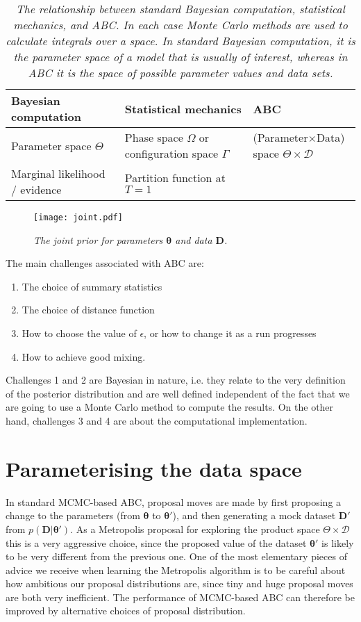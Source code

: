 \documentclass[a4paper, 11pt]{article}
\newcommand{\params}{\boldsymbol{\theta}}	%
\newcommand{\data}{\boldsymbol{D}}  %
\begin{document}
\begin{table}[ht!]
\centering
\small
\begin{tabular}{lll}
\hline
Bayesian computation		&		Statistical mechanics		&		ABC\\
\hline
Parameter space	$\Theta$	&		Phase space	$\Omega$ or configuration space $\Gamma$ 			& (Parameter$\times$Data) space $\Theta \times \mathcal{D}$\\		
Marginal likelihood / evidence	&	Partition function at $T=1$	&\\


\end{tabular}
\caption{\it The relationship between standard Bayesian computation, statistical
mechanics, and ABC. In each case Monte Carlo methods are used to calculate
integrals over a space. In standard Bayesian computation, it is the parameter
space of a model that is usually of interest, whereas in ABC it is the space
of possible parameter values {\it and} data sets.
\label{tab:relation}}
\end{table}


\begin{figure}[ht!]
\centering
\texttt{[image: joint.pdf]}
\caption{\it The joint prior for parameters $\params$ and data $\data$.
\label{fig:joint}}
\end{figure}

The main challenges associated with ABC are:
\begin{enumerate}
\item The choice of summary statistics
\item The choice of distance function
\item How to choose the value of $\epsilon$, or how to change it as a run
progresses
\item How to achieve good mixing.
\end{enumerate}
Challenges 1 and 2 are Bayesian in nature, i.e. they relate to the very
definition of the posterior distribution and are well defined independent of
the fact that we are going to use a Monte Carlo method to compute the
results. On the other hand, challenges 3 and 4 are about the computational implementation.

\section{Parameterising the data space}
In standard MCMC-based ABC, proposal moves are made by first proposing a
change to the parameters (from $\params$ to $\params'$), and then generating
a mock dataset $\data'$ from $p(\data | \params')$. As a Metropolis proposal
for exploring the product space $\Theta \times \mathcal{D}$ this is a very
aggressive choice, since the proposed value of the
dataset $\params'$ is likely to be very different from the previous one.
One of the most elementary pieces of advice we receive when learning the
Metropolis algorithm is to be careful about how ambitious our proposal
distributions are, since tiny and huge proposal moves are both very
inefficient. The performance of MCMC-based ABC can therefore be improved by
alternative choices of proposal distribution.
\end{document}
